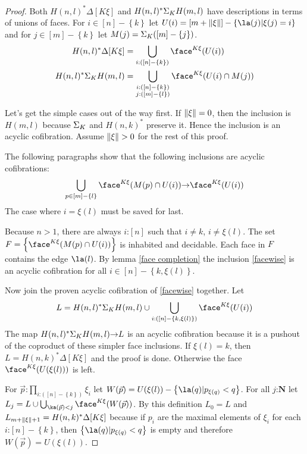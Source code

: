 \documentclass{amsart}
\theoremstyle{plain}
\theoremstyle{definition}
\newcommand\set[1]{\left\{#1\right\}}
\newcommand\ri{^*}
\newcommand\nno{\mathbf N}
\newcommand\of{\mathord:}
\renewcommand\to{\mathord\rightarrow}
\newcommand\simplex\Delta
\begin{document}
\begin{proof} 
\newcommand\U{U}
\newcommand\A{M}
Both $H(n,l)\ri\simplex[K\xi]$ and $H(n,l)\ri \depsum K H(m,l)$ have descriptions in terms of unions of faces. For $i\in [n]-\set k$ let $\U(i) = [m+\norm\xi]-\set{\la(j)|\xi(j)=i}$ and for $j\in [m]-\set k$ let $\A(j) = \depsum K([m]-\set j)$.
\begin{align*}
H(n,l)\ri\simplex[K\xi] &= \bigcup_{i\of([n]-\set{k})} \face^{K\xi}(\U(i))\\
H(n,l)\ri \depsum K H(m,l)&= \bigcup_{\substack{i\of([n]-\set{k})\\j\of([m]-\set l)}} \face^{K\xi}(\U(i)\cap \A(j))
\end{align*}

Let's get the simple cases out of the way first. If $\Vert \xi \Vert = 0$, then the inclusion is $H(m,l)$ because $\Sigma_{K}$ and $H(n,k)\ri$ preserve it. Hence the inclusion is an acyclic cofibration. Assume $\Vert \xi \Vert>0$ for the rest of this proof.

The following paragraphs show that the following inclusions are acyclic cofibrations:
\begin{equation} \bigcup_{p\in[m]-\set l} \face^{K\xi}(\A(p)\cap\U(i))\to \face^{K\xi}(\U(i)) \label{facewise} \end{equation}
The case where $i=\xi(l)$ must be saved for last.

Because $n>1$, there are always $i\of[n]$ such that $i\neq k$, $i\neq \xi(l)$. The set $F = \set{\face^{K\xi}(\A(p)\cap\U(i))}$ is inhabited and decidable. Each face in $F$ contains the edge $\la(l)$. By lemma \ref{face completion} the inclusion \ref{facewise} is an acyclic cofibration for all $i\in [n]-\set{k,\xi(l)}$.

Now join the proven acyclic cofibration of \ref{facewise} together. Let
\[ L=H(n,l)\ri \depsum K H(m,l)\cup\bigcup_{i\of([n]-\set{k,\xi(l)})}\face^{K\xi}(\U(i)) \]
The map $H(n,l)\ri \depsum K H(m,l)\to L$ is an acyclic cofibration because it is a pushout of the coproduct of these simpler face inclusions. If $\xi(l)=k$, then $L=H(n,k)\ri \simplex[K\xi]$ and the proof is done. Otherwise the face $\face^{K\xi}(\U(\xi(l)))$ is left.

\newcommand\W{W}
For $\vec p \of\prod_{i\of([n]-\set k)}\xi_i$ let $\W(\vec p) = \U(\xi(l))-\set{ \la(q) | p_{\xi(q)} < q }$. For all $j\of\nno$ let $L_j = L\cup \bigcup_{ \ka(\vec p) < j } \face^{K\xi}(\W(\vec p))$. By this definition $L_0=L$ and $L_{m+\norm\xi+1} = H(n,k)\ri\simplex[K\xi]$ because if $p_i$ are the maximal elements of $\xi_i$ for each $i\of[n]-\set k$, then $\set{ \la(q) | p_{\xi(q)} < q }$ is empty and therefore $\W(\vec p) = \U(\xi(l))$.


\end{proof}
\end{document}
